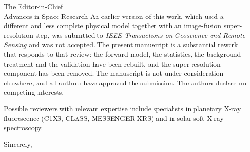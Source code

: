 \documentclass[11pt]{letter}
\begin{document}
\begin{letter}{The Editor-in-Chief\\Advances in Space Research}
An earlier version of this work, which used a different and less complete physical model together with an image-fusion super-resolution step, was submitted to \emph{IEEE Transactions on Geoscience and Remote Sensing} and was not accepted. The present manuscript is a substantial rework that responds to that review: the forward model, the statistics, the background treatment and the validation have been rebuilt, and the super-resolution component has been removed. The manuscript is not under consideration elsewhere, and all authors have approved the submission. The authors declare no competing interests.

Possible reviewers with relevant expertise include specialists in planetary X-ray fluorescence (C1XS, CLASS, MESSENGER XRS) and in solar soft X-ray spectroscopy.

\closing{Sincerely,}
\end{letter}
\end{document}

